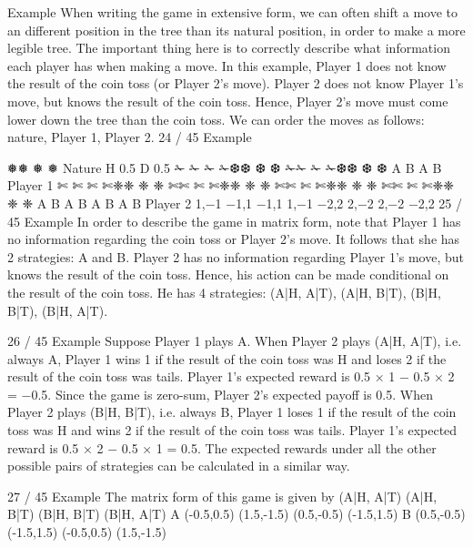 Example
When writing the game in extensive form, we can often shift a
move to an different position in the tree than its natural position,
in order to make a more legible tree.
The important thing here is to correctly describe what information
each player has when making a move.
In this example, Player 1 does not know the result of the coin toss
(or Player 2’s move).
Player 2 does not know Player 1’s move, but knows the result of
the coin toss. Hence, Player 2’s move must come lower down the
tree than the coin toss. We can order the moves as follows:
nature, Player 1, Player 2.
24 / 45
Example



❅❅
❅
❅
Nature
H 0.5 D 0.5
✁
✁
✁
✁❆❆
❆
❆ ✁✁
✁
✁❆❆
❆
❆
A B A B
Player 1
✄
✄
✄
✄❈❈
❈
❈ ✄✄
✄
✄❈❈
❈
❈ ✄✄
✄
✄❈❈
❈
❈ ✄✄
✄
✄❈❈
❈
❈
A B A B A B A B
Player 2
1,−1 −1,1 −1,1 1,−1 −2,2 2,−2 2,−2 −2,2
25 / 45
Example
In order to describe the game in matrix form, note that Player 1
has no information regarding the coin toss or Player 2’s move. It
follows that she has 2 strategies: A and B.
Player 2 has no information regarding Player 1’s move, but knows
the result of the coin toss. Hence, his action can be made
conditional on the result of the coin toss. He has 4 strategies:
(A|H, A|T), (A|H, B|T), (B|H, B|T), (B|H, A|T).

26 / 45
Example
Suppose Player 1 plays A.
When Player 2 plays (A|H, A|T), i.e. always A, Player 1 wins 1 if
the result of the coin toss was H and loses 2 if the result of the
coin toss was tails. Player 1’s expected reward is
0.5 × 1 − 0.5 × 2 = −0.5. Since the game is zero-sum, Player 2’s
expected payoff is 0.5.
When Player 2 plays (B|H, B|T), i.e. always B, Player 1 loses 1 if
the result of the coin toss was H and wins 2 if the result of the
coin toss was tails. Player 1’s expected reward is
0.5 × 2 − 0.5 × 1 = 0.5.
The expected rewards under all the other possible pairs of
strategies can be calculated in a similar way.

27 / 45
Example
The matrix form of this game is given by
(A|H, A|T) (A|H, B|T) (B|H, B|T) (B|H, A|T)
A (-0.5,0.5) (1.5,-1.5) (0.5,-0.5) (-1.5,1.5)
B (0.5,-0.5) (-1.5,1.5) (-0.5,0.5) (1.5,-1.5)

